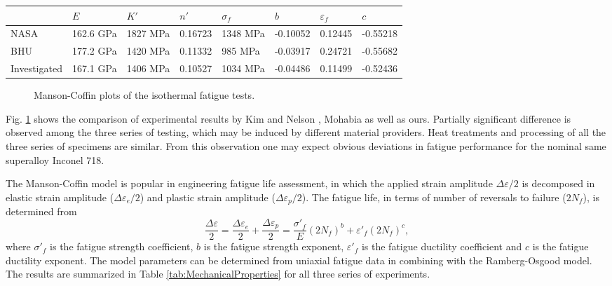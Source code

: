 \documentclass[preprint,5p,twocolumn,11pt,sort&compress]{elsarticle}
\begin{document}
\begin{table*}[htbp]
  \centering
  \caption{Basic properties of Nickel-based superalloy Inconel 718 at 650$^{\circ}$C.}
    \begin{tabular}{llllllll}
    \hline
          & $E$     & $K'$     & $n'$     & $\sigma_f$    & $b$     & $\varepsilon_f$    & $c$ \\
    \hline
    NASA \cite{kim1988elevated, nelson1992creep}  & 162.6 GPa & 1827 MPa  & 0.16723 & 1348 MPa & -0.10052 & 0.12445 & -0.55218 \\
    BHU \cite{Mahobia2014}   & 177.2 GPa & 1420 MPa  & 0.11332 & 985 MPa & -0.03917 & 0.24721 & -0.55682 \\
    Investigated   & 167.1 GPa & 1406 MPa  & 0.10527 & 1034 MPa & -0.04486 & 0.11499 & -0.52436 \\
    \hline
    \end{tabular}%
  \label{tab:MechanicalProperties}%
\end{table*}%

\begin{figure}[!htp]
\caption{Manson-Coffin plots of the isothermal fatigue tests.}
\label{Fig:Baseline}
\end{figure}

Fig. \ref{Fig:Baseline} shows the comparison of experimental results by Kim \cite{kim1988elevated} and Nelson \cite{nelson1992creep}, Mohabia \cite{Mahobia2014} as well as ours. Partially significant difference is observed among the three series of testing, which may be induced by different material providers. Heat treatments and processing of all the three series of specimens are similar. From this observation one may expect obvious deviations in fatigue performance for the nominal same superalloy Inconel 718. 

The Manson-Coffin model is popular in engineering fatigue life assessment, in which the applied strain amplitude $\Delta \varepsilon/2$ is decomposed in elastic strain amplitude ($\Delta \varepsilon_e/2$) and plastic strain amplitude ($\Delta \varepsilon_p/2$). The fatigue life, in terms of number of reversals to failure ($2N_f$), is determined from
\begin{equation}
\frac{{\Delta \varepsilon }}{2} = \frac{{\Delta {\varepsilon _e}}}{2} + \frac{{\Delta {\varepsilon _p}}}{2} = \frac{{{{\sigma '}_f}}}{E}{\left( {2{N_f}} \right)^b} + {\varepsilon '_f}{\left( {2{N_f}} \right)^c},
\label{Equ:CoffinManson}
\end{equation}
where ${{{\sigma '}_f}}$ is the fatigue strength coefficient, $b$ is the fatigue strength exponent, ${{{\varepsilon '}_f}}$ is the fatigue ductility coefficient and $c$ is the fatigue ductility exponent. The model parameters can be determined from uniaxial fatigue data in combining with the Ramberg-Osgood model. The results are summarized in Table \ref{tab:MechanicalProperties} for all three series of experiments.
\end{document}
